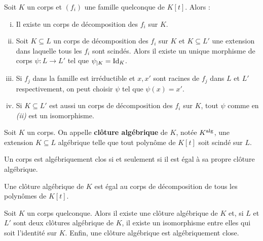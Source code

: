 
	\begin{pop}
		Soit $K$ un corps et $(f_i)$ une famille quelconque de $K[t]$. Alors :
		\begin{enumerate}[(i)]
			\item Il existe un corps de décomposition des $f_i$ sur $K$.
			\item Soit $K \subseteq L$ un corps de décomposition des $f_i$ sur $K$ et $K \subseteq L'$ une extension dans laquelle tous les $f_i$ sont scindés.
				Alors il existe un unique morphisme de corps $\psi \colon L \to L'$ tel que $\psi_{|K} = \operatorname{Id}_K$.
			\item Si $f_j$ dans la famille est irréductible et $x,x'$ sont racines de $f_j$ dans $L$ et $L'$ respectivement, on peut choisir $\psi$ tel que $\psi(x) = x'$.
			\item Si $K \subseteq L'$ est aussi un corps de décomposition des $f_i$ sur $K$, tout $\psi$ comme en \textit{(ii)} est un isomorphisme.
		\end{enumerate}
	\end{pop}

	\begin{defn}
		Soit $K$ un corps.
		On appelle \textbf{clôture algébrique} de $K$, notée $K^{\operatorname{alg}}$, une extension $K \subseteq L$ algébrique telle que tout polynôme de $K[t]$ soit scindé sur $L$.
	\end{defn}

	\begin{rem}
		Un corps est algébriquement clos si et seulement si il est égal à sa propre clôture algébrique.
	\end{rem}

	\begin{rem}
		Une clôture algébrique de $K$ est égal au corps de décomposition de tous les polynômes de $K[t]$.
	\end{rem}

	\begin{thm}
		Soit $K$ un corps quelconque.
		Alors il existe une clôture algébrique de $K$ et, si $L$ et $L'$ sont deux clôtures algébrique de $K$, il existe un isomorphisme entre elles qui soit l'identité sur $K$.
		Enfin, une clôture algébrique est algébriquement close.
	\end{thm}
